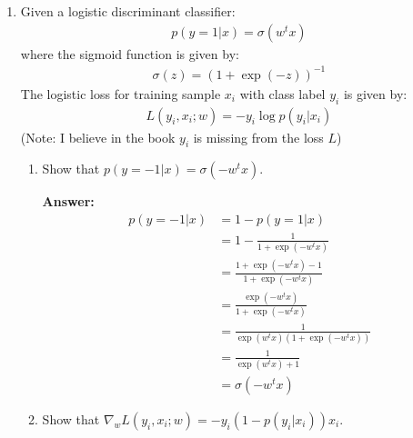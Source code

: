 \documentclass{article}
\newenvironment{QandA}{\begin{enumerate}[label=\arabic*.]}{\end{enumerate}}
\newenvironment{InnerQandA}{\begin{enumerate}[label=\roman*.]}{\end{enumerate}}
\newenvironment{answer}{\par\normalfont \textbf{Answer:}}{}
\begin{document}
\begin{QandA}
\begin{InnerQandA}
\begin{answer}
        (Source: \href{https://statproofbook.github.io/P/entcross-conv}{The Book of Statistical Proofs})
        \end{answer}
    \end{InnerQandA}

    \item Given a logistic discriminant classifier:
    \begin{align*}
        p(y=1 \vert x) = \sigma(w^tx)
    \end{align*}
    where the sigmoid function is given by:
    \begin{align*}
        \sigma(z) = (1 + \exp(-z))^{-1} 
    \end{align*}
    The logistic loss for training sample $x_i$ with class label $y_i$ is given by:
    \begin{align*}
        L(y_i, x_i; w) = -y_i \log p(y_i \vert x_i)
    \end{align*}
    (Note: I believe in the book $y_i$ is missing from the loss $L$)
    
    \begin{InnerQandA}
        \item Show that $p(y=-1 \vert x) = \sigma (-w^t x)$.
        \begin{answer}
            \begin{align*}
                p(y=-1 \vert x) &= 1 - p(y=1 \vert x) \\
                &= 1 - \frac{1}{1 + \exp(-w^tx)} \\
                &= \frac{1 + \exp(-w^tx) - 1}{1 + \exp(-w^tx)} \\ 
                &= \frac{\exp(-w^tx)}{1 + \exp(-w^tx)} \\ 
                &= \frac{1}{\exp(w^tx)(1 + \exp(-w^tx))} \\
                &= \frac{1}{\exp(w^tx) + 1} \\
                &= \sigma (-w^t x)
            \end{align*}
        \end{answer}

        \item Show that $\nabla_w L (y_i, x_i; w) = -y_i (1 - p(y_i \vert x_i))x_i$.


\end{InnerQandA}
\end{QandA}
\end{document}
